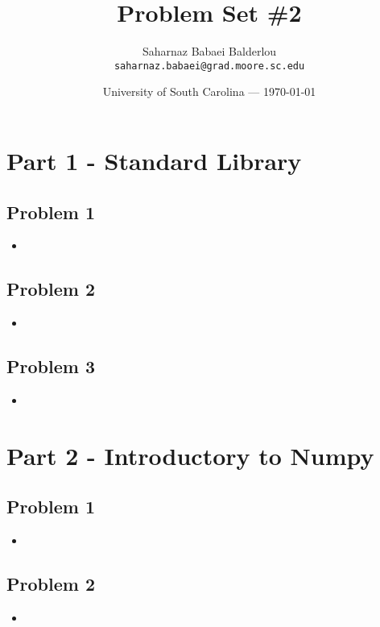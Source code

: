 \documentclass{article}
\title{Problem Set \#2} %
\author{Saharnaz Babaei Balderlou\\ \texttt{saharnaz.babaei@grad.moore.sc.edu}} %
\date{University of South Carolina --- \today} %
\newcommand{\insertcode}[2]{\begin{itemize}\item[]\end{itemize}} %
\begin{document}
\maketitle %


\section*{Part 1 - Standard Library} %

\subsection*{Problem 1}
\insertcode{"p11.pl"}{} %

\subsection*{Problem 2}
\insertcode{"p12.pl"}{} %

\subsection*{Problem 3}
\insertcode{"p13.pl"}{} %

\vspace{5mm}

\section*{Part 2 - Introductory to Numpy}

\subsection*{Problem 1}
\insertcode{"p21.pl"}{} %

\subsection*{Problem 2}
\insertcode{"p22.pl"}{} %
\end{document}
